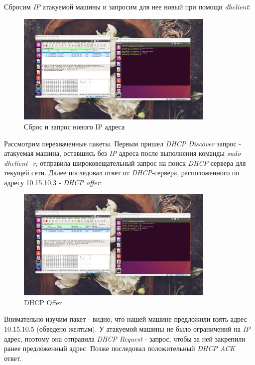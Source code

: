 \documentclass[a4paper]{article}
\begin{document}
  Сбросим \textit{IP} атакуемой машины и запросим для нее новый при помощи \textit{dhclient}:
  
  \begin{figure}[H]
    \centering
    \includegraphics[width=0.85\textwidth]{02_00 (19)}
    \caption{Сброс и запрос нового IP адреса}
    \label{img:0016}
  \end{figure}

  Рассмотрим перехваченные пакеты. Первым пришел \textit{DHCP Discover} запрос - атакуемая машина,
  оставшись без \textit{IP} адреса после выполнения команды \textit{sudo dhclient -r}, отправила
  широковещательный запрос на поиск \textit{DHCP} сервера для текущей сети. Далее последовал ответ от \textit{DHCP}-сервера,
  расположенного по адресу 10.15.10.3 - \textit{DHCP offer}:

  \begin{figure}[H]
    \centering
    \includegraphics[width=0.85\textwidth]{02_00 (20)}
    \caption{DHCP Offer}
    \label{img:0017}
  \end{figure}

  Внимательно изучим пакет - видно, что нашей машине предложили взять
  адрес 10.15.10.5 (обведено желтым). У атакуемой машины не было ограничений на \textit{IP}
  адрес, поэтому она отправила \textit{DHCP Request} - запрос, чтобы за ней закрепили
  ранее предложенный адрес. Позже последовал положительный \textit{DHCP ACK} ответ.
\end{document}
